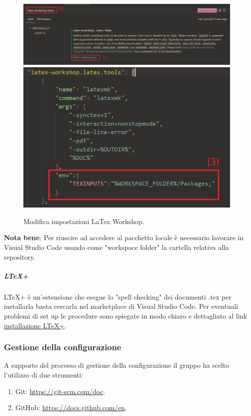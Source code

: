 \begin{figure}[!h]
    \center
    \includegraphics[scale=0.4]{Sezioni/ProcessiDiSupporto/Immagini/texinputs_setup.png}
    \includegraphics[]{Sezioni/ProcessiDiSupporto/Immagini/texinputs_setup_json.jpg}
    \caption{Modifica impostazioni LaTex Workshop.}
    \label{fig:texinputs}
\end{figure}
\textbf{Nota bene}: Per riuscire ad accedere al pacchetto locale è necessario lavorare in Visual Studio Code usando come "workspace folder" la cartella relativa alla repository.

\subparagraph{LTeX+}
LTeX+ è un'estensione che esegue lo "spell checking" dei documenti .tex per installarla basta cercarla nel marketplace di Visual Studio Code.
Per eventuali problemi di set up le procedure sono spiegate in modo chiaro e dettagliato al link \href{https://ltex-plus.github.io/ltex-plus/vscode-ltex-plus/setting-scopes-files.html}{installazione LTeX+}.

\subsubsection{Gestione della configurazione}
A supporto del processo di gestione della configurazione il gruppo ha scelto l'utilizzo di due strumenti:
\begin{enumerate}
    \item Git: \href{https://git-scm.com/doc}{https://git-scm.com/doc}.
    \item GitHub: \href{https://docs.github.com/en}{https://docs.github.com/en}.
\end{enumerate}

